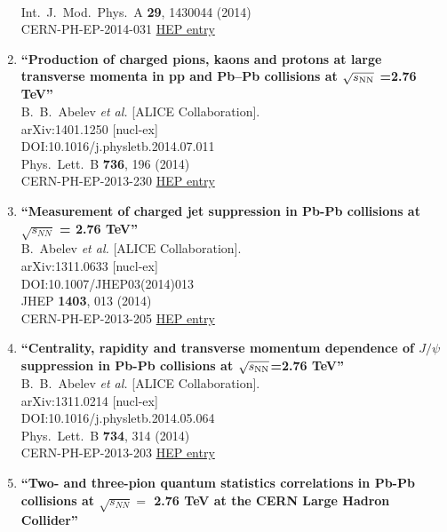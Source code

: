 \begin{enumerate}
  \\{}Int.\ J.\ Mod.\ Phys.\ A {\bf 29}, 1430044 (2014)
  \\{}CERN-PH-EP-2014-031
\href{http://inspirehep.net/record/1281831}{HEP entry}
\item%
{\bf ``Production of charged pions, kaons and protons at large transverse momenta in pp and Pb–Pb collisions at $\sqrt{s_{\rm NN}}$ =2.76 TeV''}
  \\{}B.~B.~Abelev {\it et al.} [ALICE Collaboration].
  \\{}arXiv:1401.1250 [nucl-ex]
  \\{}DOI:10.1016/j.physletb.2014.07.011
  \\{}Phys.\ Lett.\ B {\bf 736}, 196 (2014)
  \\{}CERN-PH-EP-2013-230
\href{http://inspirehep.net/record/1276299}{HEP entry}
\item%
{\bf ``Measurement of charged jet suppression in Pb-Pb collisions at $\sqrt{s_{NN}}$ = 2.76 TeV''}
  \\{}B.~Abelev {\it et al.} [ALICE Collaboration].
  \\{}arXiv:1311.0633 [nucl-ex]
  \\{}DOI:10.1007/JHEP03(2014)013
  \\{}JHEP {\bf 1403}, 013 (2014)
  \\{}CERN-PH-EP-2013-205
\href{http://inspirehep.net/record/1263194}{HEP entry}
\item%
{\bf ``Centrality, rapidity and transverse momentum dependence of $J/\psi$ suppression in Pb-Pb collisions at $\sqrt{s_{\rm NN}}$=2.76 TeV''}
  \\{}B.~B.~Abelev {\it et al.} [ALICE Collaboration].
  \\{}arXiv:1311.0214 [nucl-ex]
  \\{}DOI:10.1016/j.physletb.2014.05.064
  \\{}Phys.\ Lett.\ B {\bf 734}, 314 (2014)
  \\{}CERN-PH-EP-2013-203
\href{http://inspirehep.net/record/1263062}{HEP entry}
\item%
{\bf ``Two- and three-pion quantum statistics correlations in Pb-Pb collisions at $\sqrt{{s}_{NN}} =$ 2.76 TeV at the CERN Large Hadron Collider''}

\end{enumerate}
